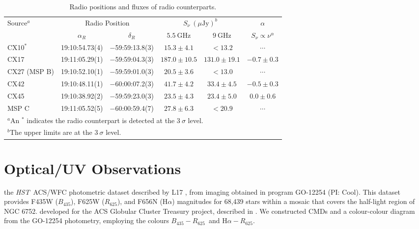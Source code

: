 \documentclass[fleqn,usenatbib]{mnras}
\newcommand{\ujy}{\mu\mathrm{Jy}}
\newcommand{\hst}{\emph{HST}}
\newcommand{\B}{\mbox{$B_{435}$}}
\newcommand{\R}{\mbox{$R_{625}$}}
\newcommand{\br}{\mbox{$\B\!-\!\R$}}
\newcommand{\ha}{\mbox{H$\alpha$}}
\newcommand{\hr}{\mbox{$\ha\!-\!\R$}}
\newcommand\nodata{ ~$\cdots$~ }%
\newcommand{\nd}{\nodata}
\newcommand{\revised}[1]{{\color{black}{#1}}}
\begin{document}
\begin{table*}
    \centering
    \caption{Radio positions and fluxes of radio counterparts.}
    \begin{tabular}{lccccc}
    \hline
    Source$^a$ & \multicolumn{2}{c}{Radio Position}  & \multicolumn{2}{c}{$S_\nu~(\ujy)^b$}    & $\alpha$ \\
         & $\alpha_R$ & $\delta_R$ & $5.5~\mathrm{GHz}$ & $9~\mathrm{GHz}$ & $S_\nu \propto \nu^\alpha$ \\
    \hline
    CX10$^\ast$    & 19:10:54.73(4) & $-$59:59:13.8(3) & $15.3  \pm 4.1$   & $<13.2$          & \nd \\
    CX17           & 19:11:05.29(1) & $-$59:59:04.3(3) & $187.0 \pm 10.5$  & $131.0 \pm 19.1$ & $-0.7 \pm 0.3$ \\
    CX27 (MSP B)   & 19:10:52.10(1) & $-$59:59:01.0(3) & $20.5  \pm 3.6$   & $<13.0$          & \nd \\
    CX42           & 19:10:48.11(1) & $-$60:00:07.2(3) & $41.7  \pm 4.2$   & $33.4 \pm 4.5$   & $-0.5 \pm 0.3$ \\
    CX45           & 19:10:38.92(2) & $-$59:59:23.0(3) & $23.5  \pm 4.3$   & $23.4 \pm 5.0$   & $0.0 \pm 0.6$ \\
    MSP C          & 19:11:05.52(5) & $-$60:00:59.4(7) & $27.8  \pm 6.3$   & $<20.9$          & \nd \\
    \hline
    \multicolumn{6}{l}{$^a$An $^\ast$ indicates the radio counterpart is detected at the $3~\sigma$ level.}\\
    \multicolumn{6}{l}{$^b$The upper limits are at the $3~\sigma$ level.}
    \end{tabular}
    \label{t:radio_matches}
\end{table*}

\section{Optical/UV Observations}

\revised{We use} the \hst\ ACS/WFC photometric dataset described by L17 \revised{(Table~\ref{t:hst_obs})}, from imaging obtained in program GO-12254 (PI: Cool). This dataset provides F435W (\B), F625W (\R), and F656N (\ha) magnitudes for 68,439 stars within a mosaic that covers \revised{slightly more than} the half-light region of NGC 6752. %
\revised{We used the KS2 update of the photometric software}
developed for the ACS Globular Cluster Treasury project, 
described in \citet{Anderson08}.%
We constructed CMDs and a colour-colour diagram from the GO-12254 photometry, employing the colours \br\ and \hr.  
\end{document}
